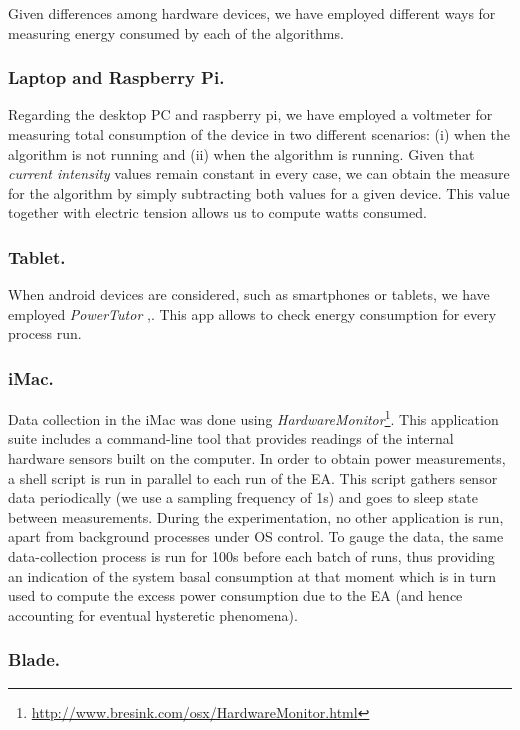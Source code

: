 Given differences among hardware devices, we have employed different ways  %
for measuring energy consumed by each of the algorithms.  

\subsubsection*{Laptop and Raspberry Pi.}
Regarding the desktop PC and raspberry pi, we have employed a voltmeter for measuring total consumption of the device in two different scenarios:  (i) when the algorithm is not running and (ii) when the algorithm is running.  Given that \textit{current intensity} values remain constant in every case, we can obtain the measure for the algorithm by simply subtracting both values for a given device.  This value together with electric tension allows us to compute watts consumed.

\subsubsection*{Tablet.}
When android devices are considered, such as smartphones or tablets, we have employed  \textit{PowerTutor} \cite{powertutor},\cite{powertutor2}. This app allows to check energy consumption for every process run.

\subsubsection*{iMac.}
Data collection in the iMac was done using \emph{HardwareMonitor}\footnote{\url{http://www.bresink.com/osx/HardwareMonitor.html}}. 
This application suite includes a command-line tool that provides readings of the internal
hardware sensors built on the computer. In order to obtain power measurements, a shell
script is run in parallel to each run of the EA. This script gathers sensor data periodically
(we use a sampling frequency of 1s) and goes to sleep state between measurements. 
During the experimentation, no other application is run, apart from background processes 
under OS control. 
To gauge the data,
the same data-collection process is run for 100s before each batch of runs, thus providing
an indication of the system basal consumption at that moment which is in turn used to 
compute the excess power consumption due to the EA (and hence accounting for
eventual hysteretic phenomena).

\subsubsection*{Blade.}

